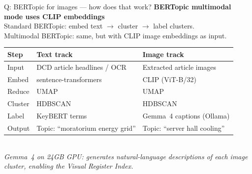 \documentclass[aspectratio=169,11pt]{beamer}
\begin{document}
\begin{frame}[noframenumbering]{\enspace Q: BERTopic for images — how does that work?}
\small\textbf{BERTopic multimodal mode uses CLIP embeddings}\\[0.4em]
\footnotesize
Standard BERTopic: embed text $\to$ cluster $\to$ label clusters.\\
Multimodal BERTopic: same, but with CLIP image embeddings as input.\\[0.5em]
\begin{tabular}{@{}lll@{}}
\toprule
\textbf{Step} & \textbf{Text track} & \textbf{Image track} \\
\midrule
Input  & DCD article headlines / OCR & Extracted article images \\
Embed  & sentence-transformers & CLIP (ViT-B/32) \\
Reduce & UMAP & UMAP \\
Cluster & HDBSCAN & HDBSCAN \\
Label  & KeyBERT terms & Gemma~4 captions (Ollama) \\
Output & Topic: ``moratorium energy grid'' & Topic: ``server hall cooling'' \\
\bottomrule
\end{tabular}\\[0.4em]
\textcolor{dcgray}{\textit{Gemma~4 on 24GB GPU: generates natural-language descriptions of each image cluster, enabling the Visual Register Index.}}
\end{frame}
\end{document}
